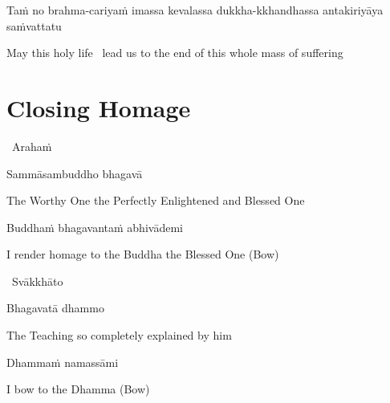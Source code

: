 \begin{pali-hang}
  Taṁ no brahma-cariyaṁ imassa kevalassa dukkha-kkhandhassa antakiriyāya saṁvattatu
\end{pali-hang}

\begin{english}
  May this holy life \breathmark\ lead us to the end of this whole mass of suffering
\end{english}


\section{Closing Homage}
\label{closing-homage}

\vspace{5pt}

\begin{leader}
  \anglebracketleft\ \hspace{-0.5mm}Arahaṁ \hspace{-0.5mm}\anglebracketright\
\end{leader}

\vspace{-0.5cm}

Sammāsambuddho bhagavā

\begin{english}
  The Worthy One the Perfectly Enlightened and Blessed One
\end{english}

Buddhaṁ bhagavantaṁ abhivādemi

\begin{english}
  I render homage to the Buddha the Blessed One \hfill{(Bow)}
\end{english}

\begin{leader}
  \anglebracketleft\ \hspace{-0.5mm}Svākkhāto \hspace{-0.5mm}\anglebracketright\
\end{leader}

\vspace{-0.5cm}

Bhagavatā dhammo

\begin{english}
  The Teaching so completely explained by him
\end{english}

Dhammaṁ namassāmi

\begin{english}
  I bow to the Dhamma \hfill{(Bow)}
\end{english}

